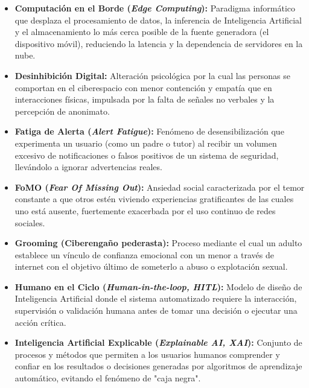 \begin{itemize}
    \item[] \textbf{Computación en el Borde (\textit{Edge Computing}):} Paradigma informático que desplaza el procesamiento de datos, la inferencia de Inteligencia Artificial y el almacenamiento lo más cerca posible de la fuente generadora (el dispositivo móvil), reduciendo la latencia y la dependencia de servidores en la nube. \\
    
    \item[] \textbf{Desinhibición Digital:} Alteración psicológica por la cual las personas se comportan en el ciberespacio con menor contención y empatía que en interacciones físicas, impulsada por la falta de señales no verbales y la percepción de anonimato. \\
    
    \item[] \textbf{Fatiga de Alerta (\textit{Alert Fatigue}):} Fenómeno de desensibilización que experimenta un usuario (como un padre o tutor) al recibir un volumen excesivo de notificaciones o falsos positivos de un sistema de seguridad, llevándolo a ignorar advertencias reales. \\
    
    \item[] \textbf{FoMO (\textit{Fear Of Missing Out}):} Ansiedad social caracterizada por el temor constante a que otros estén viviendo experiencias gratificantes de las cuales uno está ausente, fuertemente exacerbada por el uso continuo de redes sociales. \\
    
    \item[] \textbf{Grooming (Ciberengaño pederasta):} Proceso mediante el cual un adulto establece un vínculo de confianza emocional con un menor a través de internet con el objetivo último de someterlo a abuso o explotación sexual. \\
    
    \item[] \textbf{Humano en el Ciclo (\textit{Human-in-the-loop, HITL}):} Modelo de diseño de Inteligencia Artificial donde el sistema automatizado requiere la interacción, supervisión o validación humana antes de tomar una decisión o ejecutar una acción crítica. \\
    
    \item[] \textbf{Inteligencia Artificial Explicable (\textit{Explainable AI, XAI}):} Conjunto de procesos y métodos que permiten a los usuarios humanos comprender y confiar en los resultados o decisiones generadas por algoritmos de aprendizaje automático, evitando el fenómeno de "caja negra". \\
    

\end{itemize}
